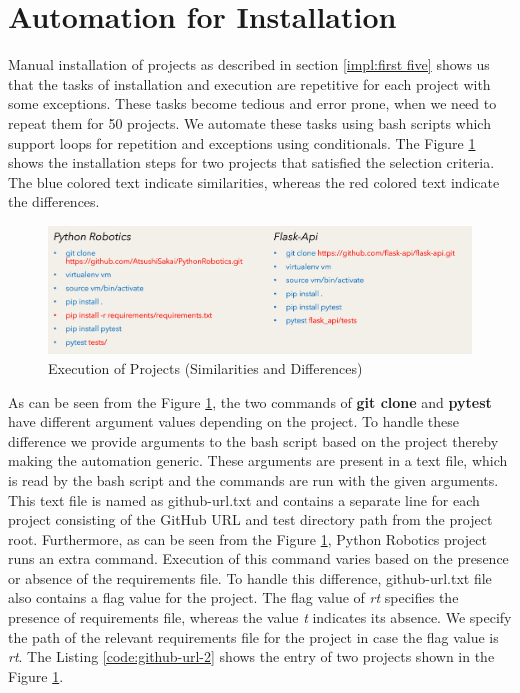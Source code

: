 \section{Automation for Installation}
\label{impl:automation}
Manual installation of projects as described in section \ref{impl:first five} shows us that the tasks of installation and execution are repetitive for each project with some exceptions.
These tasks become tedious and error prone, when we need to repeat them for 50 projects.
We automate these tasks using bash scripts which support loops for repetition and exceptions using conditionals.
The Figure \ref{fig:setup difference} shows the installation steps for two projects that satisfied the selection criteria.
The blue colored text indicate similarities, whereas the red colored text indicate the differences.

\begin{figure}[ht]
    \centering
    \includegraphics[width=1\linewidth]{figures/implementation/Setup-difference.png}
    \caption{Execution of Projects (Similarities and Differences)}
    \label{fig:setup difference}
\end{figure}

As can be seen from the Figure \ref{fig:setup difference}, the two commands of \textbf{git clone} and \textbf{pytest} have different argument values depending on the project.
To handle these difference we provide arguments to the bash script based on the project thereby making the automation generic.
These arguments are present in a text file, which is read by the bash script and the commands are run with the given arguments.
This text file is named as github-url.txt and contains a separate line for each project consisting of the GitHub URL and test directory path from the project root.
Furthermore, as can be seen from the Figure \ref{fig:setup difference}, Python Robotics project runs an extra command.
Execution of this command varies based on the presence or absence of the requirements file.
To handle this difference, github-url.txt file also contains a flag value for the project.
The flag value of \textit{rt} specifies the presence of requirements file, whereas the value \textit{t} indicates its absence.
We specify the path of the relevant requirements file for the project in case the flag value is \textit{rt}.
The Listing \ref{code:github-url-2} shows the entry of two projects shown in the Figure \ref{fig:setup difference}.

